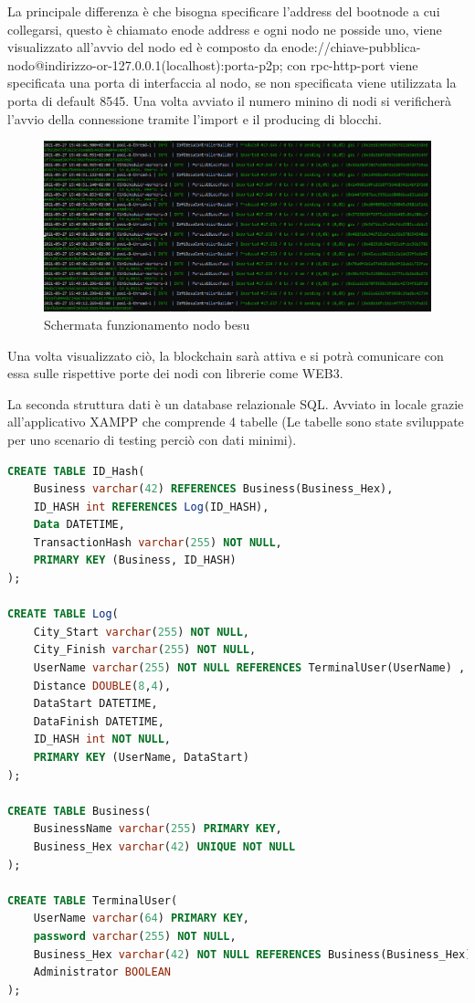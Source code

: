 \documentclass[11pt,a4paper,titlepage]{report}
\begin{document}
La principale differenza è che bisogna specificare l'address del bootnode a cui collegarsi, questo è chiamato enode address e ogni nodo ne posside uno, viene visualizzato all'avvio del nodo ed è composto da 
enode://chiave-pubblica-nodo@indirizzo-or-127.0.0.1(localhost):porta-p2p; con rpc-http-port viene specificata una porta di interfaccia al nodo, se non specificata viene utilizzata la porta di default 8545. Una volta avviato il numero minino di nodi si verificherà l'avvio della connessione tramite l'import e il producing di blocchi.
\begin{figure}[h]
	\includegraphics[width=\textwidth]{Besu-imported-produced}
	\centering
	\caption{Schermata funzionamento nodo besu}
	\label{fig:besu-imported-produced}
\end{figure}
Una volta visualizzato ciò, la blockchain sarà attiva e si potrà comunicare con essa sulle rispettive porte dei nodi con librerie come WEB3.

La seconda struttura dati è un database relazionale SQL. Avviato in locale grazie all'applicativo XAMPP che comprende 4 tabelle (Le tabelle sono state sviluppate per uno scenario di testing perciò con dati minimi).
\begin{lstlisting}[language=SQL]
CREATE TABLE ID_Hash(
	Business varchar(42) REFERENCES Business(Business_Hex),
	ID_HASH int REFERENCES Log(ID_HASH),
	Data DATETIME,
	TransactionHash varchar(255) NOT NULL,
	PRIMARY KEY (Business, ID_HASH)
);

CREATE TABLE Log(
	City_Start varchar(255) NOT NULL,
	City_Finish varchar(255) NOT NULL,
	UserName varchar(255) NOT NULL REFERENCES TerminalUser(UserName) ,
	Distance DOUBLE(8,4),
	DataStart DATETIME,
	DataFinish DATETIME,
	ID_HASH int NOT NULL,
	PRIMARY KEY (UserName, DataStart)
);

CREATE TABLE Business(
	BusinessName varchar(255) PRIMARY KEY,
	Business_Hex varchar(42) UNIQUE NOT NULL
);

CREATE TABLE TerminalUser(
	UserName varchar(64) PRIMARY KEY,
	password varchar(255) NOT NULL,
	Business_Hex varchar(42) NOT NULL REFERENCES Business(Business_Hex),
	Administrator BOOLEAN
);
\end{lstlisting}
\end{document}
